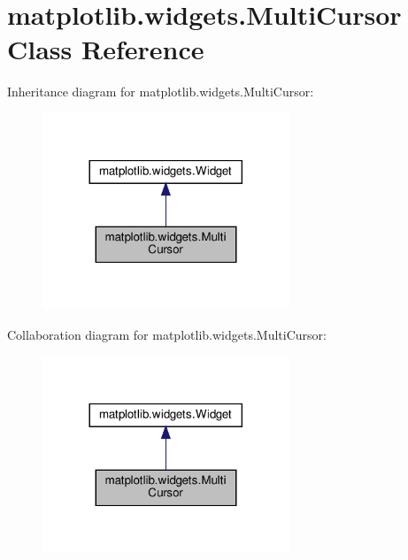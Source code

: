 \hypertarget{classmatplotlib_1_1widgets_1_1MultiCursor}{}\section{matplotlib.\+widgets.\+Multi\+Cursor Class Reference}
\label{classmatplotlib_1_1widgets_1_1MultiCursor}


Inheritance diagram for matplotlib.\+widgets.\+Multi\+Cursor\+:
\nopagebreak
\begin{figure}[H]
\begin{center}
\leavevmode
\includegraphics[width=209pt]{classmatplotlib_1_1widgets_1_1MultiCursor__inherit__graph}
\end{center}
\end{figure}


Collaboration diagram for matplotlib.\+widgets.\+Multi\+Cursor\+:
\nopagebreak
\begin{figure}[H]
\begin{center}
\leavevmode
\includegraphics[width=209pt]{classmatplotlib_1_1widgets_1_1MultiCursor__coll__graph}
\end{center}
\end{figure}
